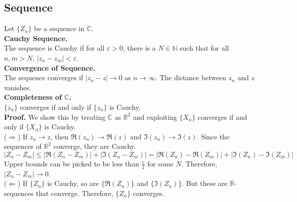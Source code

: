 \documentclass[11pt]{article}
\begin{document}
\subsection{Sequence}
Let $\{Z_n\}$ be a sequence in $\mathbb{C}$. \\
\newline
\textbf{Cauchy Sequence. }\\
The sequence is Cauchy if for all $\varepsilon > 0$, there is a $N \in \mathbb{N}$ such that for all $n, m > N$, $|z_n - z_m| < \varepsilon$. \\
\newline
\textbf{Convergence of Sequence.}\\ 
The sequence converges if $|z_n - z| \to 0$ as $n \to \infty$. The distance between $z_n$ and $z$ vanishes. \\
\newline
\textbf{Completeness of $\mathbb{C}$.} \\
$\{z_n\}$ converges if and only if $\{z_n\}$ is Cauchy. \\
\textbf{Proof.} 
We show this by treating $\mathbb{C}$ as $\mathbb{R}^2$ and exploiting $\{X_n\}$ converges if and only if $\{X_n\}$ is Cauchy. \\
($\Longrightarrow$) If $z_n \to z$, then $\Re(z_n) \to \Re(z)$ and $\Im(z_n) \to \Im(z)$. Since the sequences of $\mathbb{R}^2$ converge, they are Cauchy. \\
$$|Z_n - Z_m| \leqslant |\Re(Z_n - Z_m)| +  |\Im(Z_n - Z_m)| = |\Re(Z_n) - \Re(Z_m)| + |\Im(Z_n) - \Im(Z_m)|$$ 
Upper bounds can be picked to be less than $\frac{\varepsilon}{2}$ for some $N$. Therefore, $|Z_n - Z_m| \to 0$. \\
\newline 
($\Longleftarrow$) If $\{Z_n\}$ is Cauchy, so are $\{\Re(Z_n)\}$ and $\{\Im(Z_n)\}$. But these are $\mathbb{R}$-sequences that converge. Therefore, $\{Z_n\}$ converges. 
\end{document}
